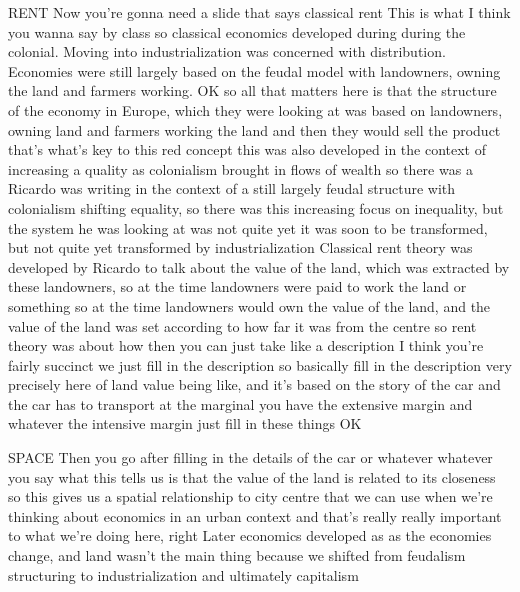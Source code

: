 RENT
Now you’re gonna need a slide that says classical rent
This is what I think you wanna say by class so classical economics developed during during the colonial. Moving into industrialization was concerned with distribution. Economies were still largely based on the feudal model with landowners, owning the land and farmers working.
OK so all that matters here is that the structure of the economy in Europe, which they were looking at was based on landowners, owning land and farmers working the land and then they would sell the product that’s what’s key to this red concept this was also developed in the context of increasing a quality as colonialism brought in flows of wealth so there was a Ricardo was writing in the context of a still largely feudal structure with colonialism shifting equality, so there was this increasing focus on inequality, but the system he was looking at was not quite yet it was soon to be transformed, but not quite yet transformed by industrialization
Classical rent theory was developed by Ricardo to talk about the value of the land, which was extracted by these landowners, so at the time landowners were paid to work the land or something so at the time landowners would own the value of the land, and the value of the land was set according to how far it was from the centre so rent theory was about how then you can just take like a description I think you’re fairly succinct we just fill in the description so basically fill in the description very precisely here of land value being like, and it’s based on the story of the car and the car has to transport at the marginal you have the extensive margin and whatever the intensive margin just fill in these things OK

SPACE
Then you go after filling in the details of the car or whatever whatever you say what this tells us is that the value of the land is related to its closeness so this gives us a spatial relationship to city centre that we can use when we’re thinking about economics in an urban context and that’s really really important to what we’re doing here, right
Later economics developed as as the economies change, and land wasn’t the main thing because we shifted from feudalism structuring to industrialization and ultimately capitalism

